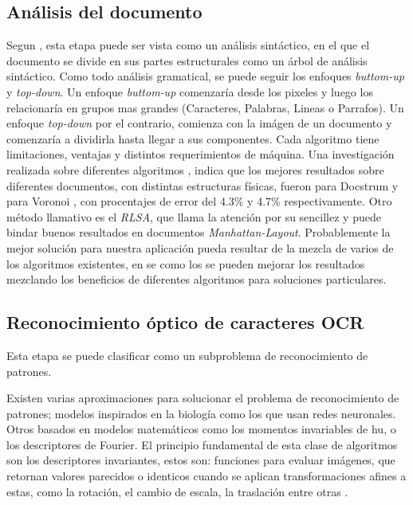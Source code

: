 \documentclass{article}
\begin{document}
	\subsection{Análisis del documento}
	Segun \cite{doc_analysis2}, esta etapa puede ser vista como un análisis sintáctico,
	en el que el documento se divide en sus partes estructurales como un árbol de análisis
	sintáctico. Como todo análisis gramatical, se puede seguir los enfoques
	\textit{buttom-up} y \textit{top-down}. Un enfoque \textit{buttom-up} comenzaría desde
	los pixeles y luego los relacionaría en grupos mas grandes (Caracteres, Palabras, Lineas
	o Parrafos). Un enfoque \textit{top-down} por el contrario, comienza con la imágen de un
	documento y comenzaría a dividirla hasta llegar a sus componentes.
	Cada algoritmo tiene limitaciones, ventajas y distintos requerimientos de máquina.
	Una investigación realizada sobre diferentes algoritmos \cite{benchmark1}, indica que los
	mejores resultados sobre diferentes documentos, con distintas estructuras físicas,
	fueron para Docstrum \cite{docstrum93} y para Voronoi \cite{voronoi1}, con procentajes
	de error del 4.3\% y 4.7\% respectivamente. Otro método
	llamativo es el \textit{RLSA}, que llama la atención por su sencillez y puede bindar
	buenos resultados en documentos \textit{Manhattan-Layout}\cite{RLSA1}.
	Probablemente la mejor solución para nuestra aplicación pueda resultar de la mezcla de
	varios de los algoritmos existentes, en \cite{voronoi2} se como los se pueden mejorar
	los resultados mezclando los beneficios de diferentes algoritmos para soluciones
	particulares.
	
	\subsection{Reconocimiento óptico de caracteres OCR}
	Esta etapa se puede clasificar como un subproblema de reconocimiento de patrones.
	
	Existen varias aproximaciones para solucionar el problema de reconocimiento de patrones; 
	modelos inspirados en la biología como los que usan redes neuronales\cite{im_biology}. Otros
	basados en modelos matemáticos como los momentos invariables de hu\cite{art_hu}, o los
	descriptores de Fourier. El principio fundamental de esta clase de algoritmos son
	los descriptores invariantes, estos son: funciones para evaluar imágenes, que retornan valores 
	parecidos o identicos cuando se aplican	transformaciones afines a estas, como la rotación,
	el cambio de escala, la traslación entre otras \cite{ocrs1}.
	
\end{document}
